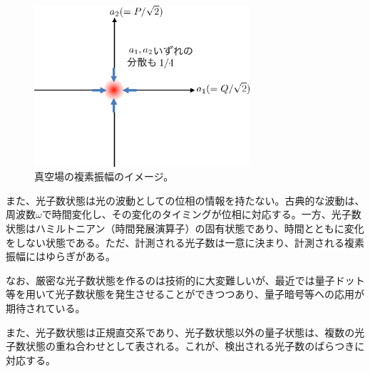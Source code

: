 \begin{figure}
  \centering
  \includegraphics[width=8cm]{fig/3-1_vacuum.eps} 
  \caption{真空場の複素振幅のイメージ。}
  \label{fig:vacuum_field}
\end{figure}

また、光子数状態は光の波動としての位相の情報を持たない。古典的な波動は、周波数$\omega$で時間変化し、その変化のタイミングが位相に対応する。一方、光子数状態はハミルトニアン（時間発展演算子）の固有状態であり、時間とともに変化をしない状態である。ただ、計測される光子数は一意に決まり、計測される複素振幅にはゆらぎがある。

なお、厳密な光子数状態を作るのは技術的に大変難しいが、最近では量子ドット等を用いて光子数状態を発生させることができつつあり、量子暗号等への応用が期待されている。

また、光子数状態は正規直交系であり、光子数状態以外の量子状態は、複数の光子数状態の重ね合わせとして表される。これが、検出される光子数のばらつきに対応する。

